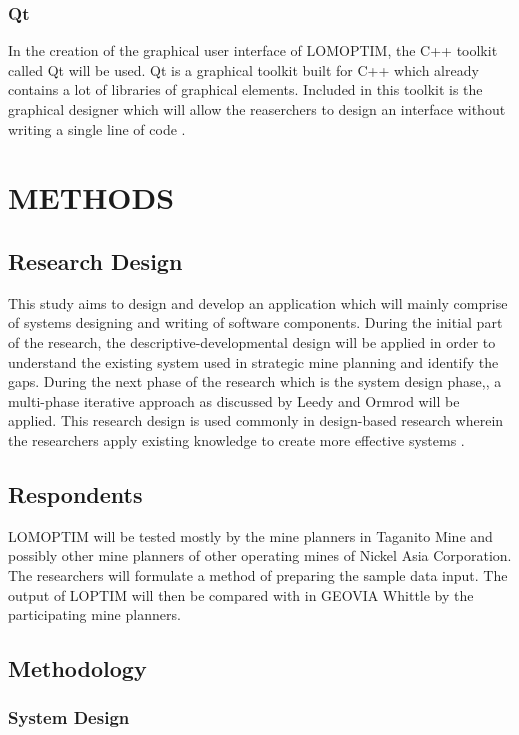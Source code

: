 \documentclass[12pt]{report}
\begin{document}
\subsection{Qt}

In the creation of the graphical user interface of LOMOPTIM, the C++ toolkit called Qt will be used.
Qt is a graphical toolkit built for C++ which already contains a lot of libraries of graphical elements.
Included in this toolkit is the graphical designer which will allow the reaserchers to design an interface without writing a single line of code \cite{qt}.

\chapter{METHODS}

\section{Research Design}

This study aims to design and develop an application which will mainly comprise of systems designing and writing of software components.
During the initial part of the research, the descriptive-developmental design will be applied in order to understand the existing system used in strategic mine planning and identify the gaps.
During the next phase of the research which is the system design phase,, a multi-phase iterative approach as discussed by Leedy and Ormrod will be applied.
This research design is used commonly in design-based research wherein the researchers apply existing knowledge to create more effective systems \cite{MixedMethod}.

\section{Respondents}

LOMOPTIM will be tested mostly by the mine planners in Taganito Mine and possibly other mine planners of other operating mines of Nickel Asia Corporation.
The researchers will formulate a method of preparing the sample data input.
The output of LOPTIM will then be compared with in GEOVIA Whittle by the participating mine planners.

\section{Methodology}

\subsection{System Design}
\end{document}
